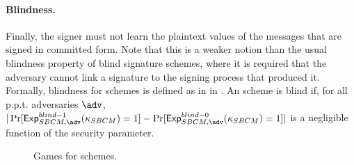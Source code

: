 \paragraph{Blindness.} %
Finally, the signer must not learn the plaintext values of the messages that are
signed in committed form. Note that this is a weaker notion than the usual
blindness property of blind signature schemes, where it is required that the
adversary cannot link a signature to the signing process that produced it.
Formally, blindness for \SBCM schemes is defined as in \ExpSBCMBlindb in
. An \SBCM scheme is blind if, for all p.p.t.
adversaries $\adv$, $|\Pr[\ExpSBCMBlindo(\SBCMsecpar) = 1] -
\Pr[\ExpSBCMBlindz(\SBCMsecpar) = 1]|$ is a negligible function of the security
parameter.

\begin{figure}[ht!]
  \begin{minipage}[t]{\textwidth}
    \centering
    

    \vspace*{0.5em}
    
  \end{minipage}
  \label{fig:sbcm-games}
  \caption{Games for \SBCM schemes.}
\end{figure}

